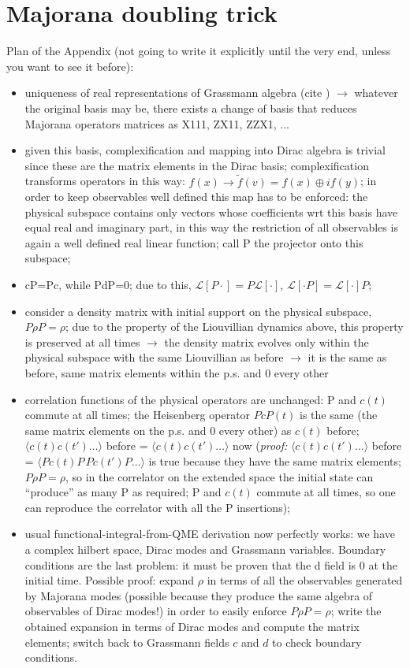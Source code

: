 \documentclass[a4paper,11pt]{article}
\theoremstyle{remark}
\newcommand{\mean}[1]{\ensuremath{\langle #1 \rangle}}
\newcommand{\ra}{\rightarrow}
\begin{document}
 \appendix
 \section{Majorana doubling trick}
 \label{sec:majorana_doubling_theory}
 Plan of the Appendix (not going to write it explicitly until the very end, unless you want to see it before):
 \begin{itemize}
  \item uniqueness of real representations of Grassmann algebra (cite \cite{Okubo1991real}) $\ra$ whatever the original basis may be, there exists a change of basis that reduces Majorana operators matrices as X111, ZX11, ZZX1, ...
  \item given this basis, complexification and mapping into Dirac algebra is trivial since these are the matrix elements in the Dirac basis; complexification transforms operators in this way: $f(x) \ra \tilde{f}(v)=f(x)\oplus if(y)$; in order to keep observables well defined this map has to be enforced: the physical subspace contains only vectors whose coefficients wrt this basis have equal real and imaginary part, in this way the restriction of all observables is again a well defined real linear function; call P the projector onto this subspace; 
  \item cP=Pc, while PdP=0; due to this, $\mathcal{L}[P\cdot]=P\mathcal{L}[\cdot]$, $\mathcal{L}[\cdot P]=\mathcal{L}[\cdot]P$;
  \item consider a density matrix with initial support on the physical subspace, $P\rho P = \rho$; due to the property of the Liouvillian dynamics above, this property is preserved at all times $\ra$ the density matrix evolves only within the physical subspace with the same Liouvillian as before $\ra$ it is the same as before, same matrix elements within the p.s. and 0 every other
  \item correlation functions of the physical operators are unchanged: P and $c(t)$ commute at all times; the Heisenberg operator $PcP(t)$ is the same (the same matrix elements on the p.s. and 0 every other) as $c(t)$ before; $\mean{c(t)c(t')\dots}$ before = $\mean{c(t) c(t')\dots}$ now (\textit{proof:} $\mean{c(t)c(t')\dots}$ before = $\mean{Pc(t)P\, Pc(t')P\dots}$ is true because they have the same matrix elements; $P\rho P = \rho$, so in the correlator on the extended space the initial state can ``produce'' as many P as required; P and $c(t)$ commute at all times, so one can reproduce the correlator with all the P insertions);
  \item usual functional-integral-from-QME derivation now perfectly works: we have a complex hilbert space, Dirac modes and Grassmann variables. Boundary conditions are the last problem: it must be proven that the d field is 0 at the initial time. Possible proof: expand $\rho$ in terms of all the observables generated by Majorana modes (possible because they produce the same algebra of observables of Dirac modes!) in order to easily enforce $P\rho P=\rho$; write the obtained expansion in terms of Dirac modes and compute the matrix elements; switch back to Grassmann fields $c$ and $d$ to check boundary conditions.
 \end{itemize}
 \pagebreak

{}
  
\end{document}
